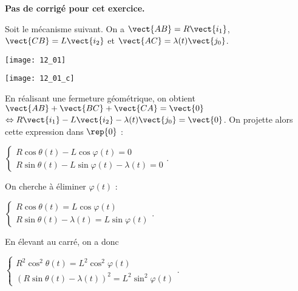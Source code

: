 \normaltrue \difficilefalse \tdifficilefalse
\correctiontrue


\setcounter{question}{0}
\ifcorrection
\else
\textbf{Pas de corrigé pour cet exercice.}
\fi

\ifprof
\else
Soit le mécanisme suivant. On a $\vect{AB}=R\vect{i_1}$, $\vect{CB}=L\vect{i_2}$ et $\vect{AC}=\lambda(t) \vect{j_0}$. 

\begin{center}
\texttt{[image: 12\_01]}
\end{center}
\fi


\ifprof
\begin{center}
\texttt{[image: 12\_01\_c]}
\end{center}
\else
\fi


\ifprof
En réalisant une fermeture géométrique, on obtient 
$\vect{AB}+\vect{BC}+\vect{CA}=\vect{0}$ 
$ \Leftrightarrow R\vect{i_1} - L\vect{i_2} - \lambda(t) \vect{j_0} = \vect{0}$.
On projette alors cette expression dans $\rep{0}$ : 

$
\left\{
\begin{array}{l}
R\cos\theta(t)- L\cos\varphi(t) = 0 \\
R\sin\theta(t) - L\sin\varphi(t) - \lambda(t) = 0 
\end{array}
\right.
$.

On cherche à éliminer $\varphi(t)$ : 

$
\left\{
\begin{array}{l}
R\cos\theta(t) = L\cos\varphi(t)  \\
R\sin\theta(t)  - \lambda(t) = L\sin\varphi(t)
\end{array}
\right.
$.

En élevant au carré, on a donc 

$\left\{
\begin{array}{l}
R^2\cos^2\theta(t) = L^2\cos^2\varphi(t)  \\
\left(R\sin\theta(t)  - \lambda(t)\right)^2 = L^2\sin^2\varphi(t)
\end{array}
\right.
$.

